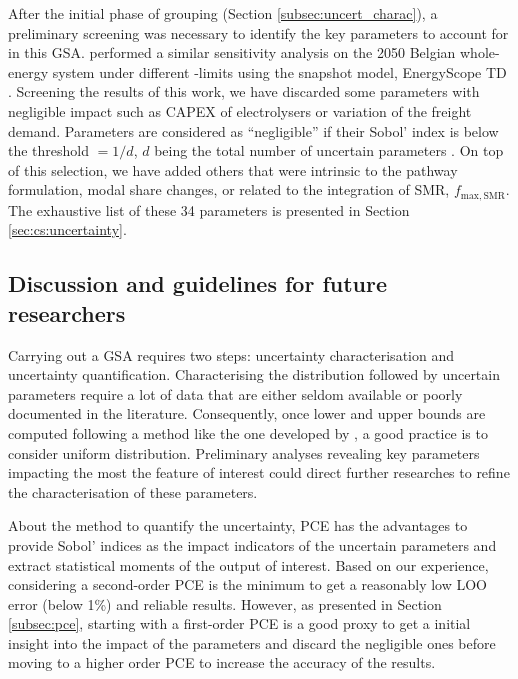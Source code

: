 After the initial phase of grouping (Section \ref{subsec:uncert_charac}), a preliminary screening was necessary to identify the key parameters to account for in this \gls{GSA}. \citet{rixhon2021role} performed a similar sensitivity analysis on the 2050 Belgian whole-energy system under different -limits using the snapshot model, EnergyScope TD \cite{limpens2019energyscope}. Screening the results of this work, we have discarded some parameters with negligible impact such as CAPEX of electrolysers or variation of the freight demand. Parameters are considered as ``negligible'' if their Sobol' index is below the threshold $=1/d$, $d$ being the total number of uncertain parameters \cite{Turati2017}. On top of this selection, we have added others that were intrinsic to the pathway formulation, \eg modal share changes, or related to the integration of \gls{SMR}, $f_{\mathrm{max,SMR}}$. The exhaustive list of these 34 parameters is presented in Section \ref{sec:cs:uncertainty}.

\subsection{Discussion and guidelines for future researchers}
\label{subsec:meth:UQ:discussion}
Carrying out a \acrfull{GSA} requires two steps: uncertainty characterisation and uncertainty quantification. Characterising the distribution followed by uncertain parameters require a lot of data that are either seldom available or poorly documented in the literature. Consequently, once lower and upper bounds are computed following a method like the one developed by \citet{Moret2017}, a good practice is to consider uniform distribution. Preliminary analyses revealing key parameters impacting the most the feature of interest could direct further researches to refine the characterisation of these parameters.

About the method to quantify the uncertainty, \gls{PCE} has the advantages to provide Sobol' indices as the impact indicators of the uncertain parameters and extract statistical moments of the output of interest. Based on our experience, considering a second-order \gls{PCE} is the minimum to get a reasonably low \gls{LOO} error (below 1\%) and reliable results. However, as presented in Section \ref{subsec:pce}, starting with a first-order \gls{PCE} is a good proxy to get a initial insight into the impact of the parameters and discard the negligible ones before moving to a higher order \gls{PCE} to increase the accuracy of the results.

